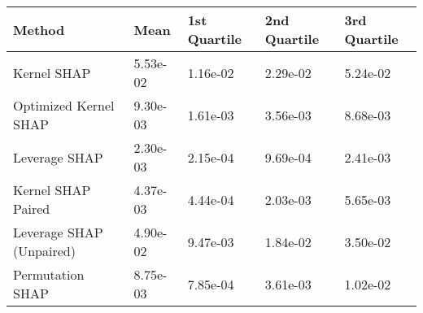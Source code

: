 \begin{tabular}{lllll}
  \toprule
  \textbf{Method} & \textbf{Mean} & \textbf{1st Quartile} & \textbf{2nd Quartile} & \textbf{3rd Quartile} \\ \midrule 
Kernel SHAP & 5.53e-02 & 1.16e-02 & 2.29e-02 & 5.24e-02\\
Optimized Kernel SHAP & 9.30e-03 & 1.61e-03 & \cellcolor{bronze!60}3.56e-03 & \cellcolor{bronze!60}8.68e-03\\
Leverage SHAP & \cellcolor{gold!60}2.30e-03 & \cellcolor{gold!60}2.15e-04 & \cellcolor{gold!60}9.69e-04 & \cellcolor{gold!60}2.41e-03\\
Kernel SHAP Paired & \cellcolor{silver!60}4.37e-03 & \cellcolor{silver!60}4.44e-04 & \cellcolor{silver!60}2.03e-03 & \cellcolor{silver!60}5.65e-03\\
Leverage SHAP (Unpaired) & 4.90e-02 & 9.47e-03 & 1.84e-02 & 3.50e-02\\
Permutation SHAP & \cellcolor{bronze!60}8.75e-03 & \cellcolor{bronze!60}7.85e-04 & 3.61e-03 & 1.02e-02\\
\bottomrule
\end{tabular}
